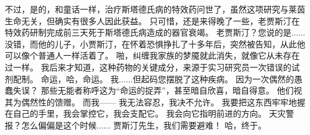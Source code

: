 \documentclass[openany]{book}
\begin{document}
\begin{dialogue}
     不过，是的，和童话一样，治疗斯塔德氏病的特效药问世了，虽然这项研究与莱茵生命无关，但确实有很多人因此获益。
     只可惜，还是来得晚了一些，老贾斯汀在特效药研制完成前三天死于斯塔德氏病造成的器官衰竭。
     老贾斯汀？您说的是......
     没错，而他的儿子，小贾斯汀，在怀着恐惧挣扎了十多年后，突然被告知，从此他可以像个普通人一样活着了。
     啪，纠缠我家族的梦魇就此消失，就像它从未存在过一样。
     我后来才知道，这种药物的关键成分，来源于实习研究员一次错误的试剂配制。
     命运，哈，命运。
     我......但起码您摆脱了这种疾病。
     因为一次偶然的愚蠢失误？
     那些无能者称呼这为“命运的捉弄”，甚至暗自欣喜，暗自得意。
     他们视其为偶然性的馈赠。
     而我——
     我无法容忍，我决不允许。
     我要把这东西牢牢地握在自己的手里，我会掌控它，我会支配它。
     我会向它指明前进的方向。
     天灾警报？怎么偏偏是这个时候......
     贾斯汀先生，我们需要避难！
     哈，终于。
\end{dialogue}
\end{document}
